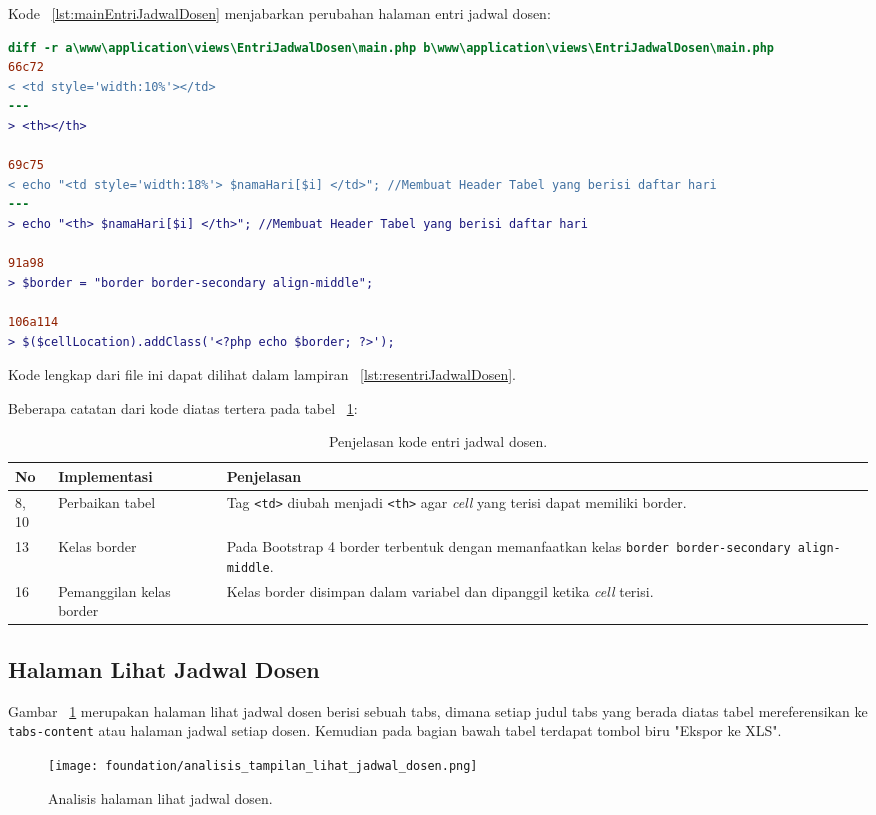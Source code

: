 Kode ~\ref{lst:mainEntriJadwalDosen} menjabarkan perubahan halaman entri jadwal dosen:
\begin{lstlisting}[language=diff, caption=Kode untuk Halaman Entri Jadwal Dosen,  basicstyle=\ttfamily, frame=single,
columns=fullflexible, keepspaces=true, breaklines=true, label={lst:mainEntriJadwalDosen}]
diff -r a\www\application\views\EntriJadwalDosen\main.php b\www\application\views\EntriJadwalDosen\main.php
66c72
< <td style='width:10%'></td>
---
> <th></th>

69c75
< echo "<td style='width:18%'> $namaHari[$i] </td>"; //Membuat Header Tabel yang berisi daftar hari
---
> echo "<th> $namaHari[$i] </th>"; //Membuat Header Tabel yang berisi daftar hari

91a98
> $border = "border border-secondary align-middle";

106a114
> $($cellLocation).addClass('<?php echo $border; ?>');
\end{lstlisting}
Kode lengkap dari file ini dapat dilihat dalam lampiran ~\ref{lst:resentriJadwalDosen}.

Beberapa catatan dari kode diatas tertera pada tabel ~\ref{tabel:entriJadwalDosen}:
\begin{table}[H]
	\centering
	\caption{Penjelasan kode entri jadwal dosen.}
	\begin{tabularx}{\textwidth}{llX}
		\toprule
		No & Implementasi     & Penjelasan \\
		\midrule
		8, 10 & Perbaikan tabel & Tag \texttt{<td>} diubah menjadi \texttt{<th>} agar \textit{cell} yang terisi dapat memiliki border.\\
		13 & Kelas border & Pada Bootstrap 4 border terbentuk dengan memanfaatkan kelas \texttt{border border-secondary align-middle}.\\
		16 & Pemanggilan kelas border & Kelas border disimpan dalam variabel dan dipanggil ketika \textit{cell} terisi.\\
		\bottomrule
	\end{tabularx}%
	\label{tabel:entriJadwalDosen}
\end{table}

\subsection{Halaman	Lihat Jadwal Dosen}
\noindent Gambar ~\ref{fig:analisisLihatJadwalDosen} merupakan halaman lihat jadwal dosen berisi sebuah tabs, dimana setiap judul tabs yang berada diatas tabel mereferensikan ke \texttt{tabs-content} atau halaman jadwal setiap dosen. Kemudian pada bagian bawah tabel terdapat tombol biru "Ekspor ke XLS".
\begin{figure} [H]
	\centering  
	\texttt{[image: foundation/analisis\_tampilan\_lihat\_jadwal\_dosen.png]}
	\caption{Analisis halaman lihat jadwal dosen.}
	\label{fig:analisisLihatJadwalDosen}
\end{figure}

